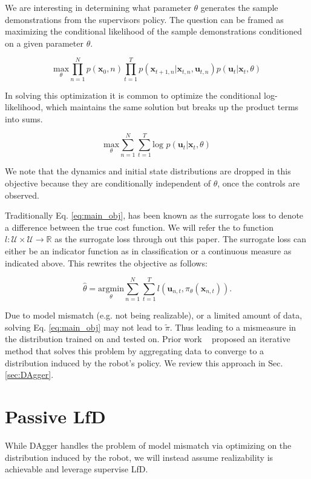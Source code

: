 \documentclass[10pt, conference]{ieeeconf}      %
\newcommand{\bu}{\mathbf{u}}
\newcommand{\bx}{\mathbf{x}}
\begin{document}
We are interesting in determining what parameter $\theta$ generates the sample demonstrations from the supervisors policy. The question can be framed as maximizing the conditional likelihood of the sample demonstrations conditioned on a given parameter $\theta$. 

$$\underset{\theta}{\mbox{max}} \prod^N_{n=1} p(\bx_0,n) \prod^T_{t=1} p(\bx_{t+1,n}|\bx_{t,n},\bu_{t,n})p(\bu_t|\bx_t,\theta)$$

In solving this optimization it is common to optimize the conditional log-likelihood, which maintains the same solution but breaks up the product terms into sums. 

\begin{equation}\label{eq:m_likeli_obj}
\underset{\theta}{\mbox{max}} \sum^N_{n=1}\sum^T_{t=1}\mbox{log }p(\bu_t|\bx_t,\theta)
\end{equation}


We note that the dynamics and initial state distributions are dropped in this objective because they are conditionally independent of $\theta$, once the controls are observed. 

 Traditionally  Eq. \ref{eq:main_obj}, has been known as the surrogate loss to denote a difference between the true cost function. We will refer the to function $l : \mathcal{U} \times \mathcal{U} \rightarrow \mathbb{R}$ as the surrogate loss through out this paper. The surrogate loss can either be an indicator function as in classification or a continuous measure as indicated above.  This rewrites the objective as follows: 

\begin{equation}\label{eq:main_obj}
\hat{\theta} = \underset{\theta}{\mbox{argmin}} \sum^N_{n=1}\sum^T_{t=1} l(\bu_{n,t}, \pi_{\theta} (\bx_{n,t})).
\end{equation}


Due to model mismatch (e.g. not being realizable), or a limited amount of data, solving Eq. \ref{eq:main_obj} may not lead to $\tilde{\pi}$.  Thus leading to a mismeasure in the distribution trained on and tested on.  Prior work ~\cite{ross2010reduction}  proposed an iterative method that solves this problem by aggregating data to converge to a distribution induced by the robot's policy. We review this approach in Sec. \ref{sec:DAgger}.
 
\section{Passive LfD}
While DAgger handles the problem of model mismatch via optimizing on the distribution induced by the robot, we will instead assume realizability is achievable and leverage supervise LfD.  
\end{document}
